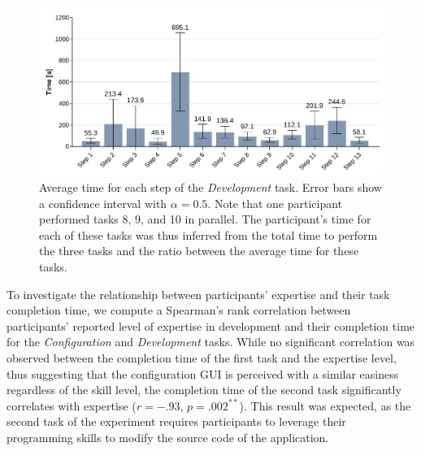 \begin{figure}[t]
    \centering
    \includegraphics[width=\linewidth]{Figures/QuantumLeap/Evaluation/Task 2 (time).pdf}
    \vspace{-18pt}
    \caption{Average time for each step of the \textit{Development} task. Error bars show a confidence interval with $\alpha{=}0.5$. Note that one participant performed tasks 8, 9, and 10 in parallel. The participant's time for each of these tasks was thus inferred from the total time to perform the three tasks and the ratio between the average time for these tasks.}
    \label{fig:quantumleap:task2-time}
\end{figure}

To investigate the relationship between participants' expertise and their task completion time, we compute a Spearman's rank correlation between participants' reported level of expertise in development and their completion time for the \textit{Configuration} and \textit{Development} tasks. While no significant correlation was observed between the completion time of the first task and the expertise level, thus suggesting that the configuration GUI is perceived with a similar easiness regardless of the skill level, the completion time of the second task significantly correlates with expertise ($r{=}-.93$, $p{=}.002^{**}$). This result was expected, as the second task of the experiment requires participants to leverage their programming skills to modify the source code of the application. 

